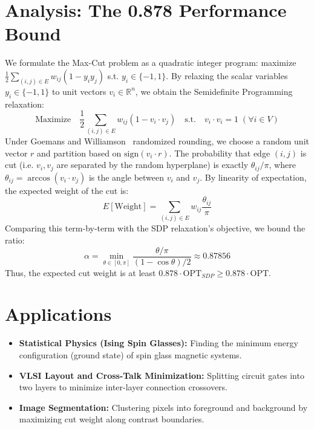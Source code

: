\section{Analysis: The 0.878 Performance Bound}
We formulate the Max-Cut problem as a quadratic integer program: maximize $\frac{1}{2} \sum_{(i,j) \in E} w_{ij} (1 - y_i y_j)$ s.t. $y_i \in \{-1, 1\}$.
By relaxing the scalar variables $y_i \in \{-1, 1\}$ to unit vectors $v_i \in \mathbb{R}^n$, we obtain the Semidefinite Programming relaxation:
\[
\text{Maximize} \quad \frac{1}{2} \sum_{(i,j) \in E} w_{ij} (1 - v_i \cdot v_j) \quad \text{s.t.} \quad v_i \cdot v_i = 1 \; (\forall i \in V)
\]
Under Goemans and Williamson~\cite{goemans-williamson94} randomized rounding, we choose a random unit vector $r$ and partition based on $\text{sign}(v_i \cdot r)$. The probability that edge $(i, j)$ is cut (i.e. $v_i, v_j$ are separated by the random hyperplane) is exactly $\theta_{ij}/\pi$, where $\theta_{ij} = \arccos(v_i \cdot v_j)$ is the angle between $v_i$ and $v_j$.
By linearity of expectation, the expected weight of the cut is:
\[
E[\text{Weight}] = \sum_{(i,j) \in E} w_{ij} \frac{\theta_{ij}}{\pi}
\]
Comparing this term-by-term with the SDP relaxation's objective, we bound the ratio:
\[
\alpha = \min_{\theta \in [0, \pi]} \frac{\theta/\pi}{(1 - \cos \theta)/2} \approx 0.87856
\]
Thus, the expected cut weight is at least $0.878 \cdot \text{OPT}_{SDP} \ge 0.878 \cdot \text{OPT}$.

\section{Applications}
\begin{itemize}
    \item \textbf{Statistical Physics (Ising Spin Glasses):} Finding the minimum energy configuration (ground state) of spin glass magnetic systems.
    \item \textbf{VLSI Layout and Cross-Talk Minimization:} Splitting circuit gates into two layers to minimize inter-layer connection crossovers.
    \item \textbf{Image Segmentation:} Clustering pixels into foreground and background by maximizing cut weight along contrast boundaries.
\end{itemize}

